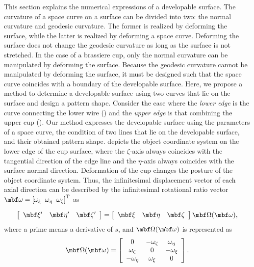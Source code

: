 \documentclass[E]{scitrans}
\begin{document}
This section explains the numerical expressions of a developable surface. The curvature of a space curve on a surface can be divided into two: the normal curvature and geodesic curvature. The former is realized by deforming the surface, while the latter is realized by deforming a space curve. Deforming the surface does not change the geodesic curvature as long as the surface is not stretched. In the case of a brassiere cup, only the normal curvature can be manipulated by deforming the surface. Because the geodesic curvature cannot be manipulated by deforming the surface, it must be designed such that the space curve coincides with a boundary of the developable surface. 
Here, we propose a method to determine a developable surface using two curves that lie on the surface and design a pattern shape. Consider the case where the \textit{lower edge} is the curve connecting the lower wire () and the \textit{upper edge} is that combining the upper cup (). Our method expresses the developable surface using the parameters of a space curve, the condition of two lines that lie on the developable surface, and their obtained pattern shape.  depicts the object coordinate system on the lower edge of the cup surface, where the $\zeta$-axis always coincides with the tangential direction of the edge line and the  $ \eta $-axis always coincides with the surface normal direction. Deformation of the cup changes the posture of the object coordinate system. Thus, the infinitesimal displacement vector of each axial direction can be described by the infinitesimal rotational ratio vector $ \mbold{\omega} = \left[\omega_{\xi}\;\;\omega_{\eta}\;\;\omega_{\zeta}\right]^{\mathrm{T}}$ as

\begin{equation}\label{eq:ObjSys}
\left[\begin{array}{ccc} \xivec' & \etavec' & \zetavec' \end{array}\right] = \left[\begin{array}{ccc} \xivec & \etavec & \zetavec \end{array} \right] \mbold{\Omega}(\mbold{\omega}), 
\end{equation}
where a prime means a derivative of $s$, and $\mbold{\Omega}(\mbold{\omega})$ is represented as
\begin{equation}
\mbold{\Omega}(\mbold{\omega}) = \left[\begin{array}{ccc}
0 &-\omega_{\zeta} & \omega_{\eta} \\
\omega_{\zeta} & 0 &-\omega_{\xi} \\
-\omega_{\eta} & \omega_{\xi} &0
\end{array}\right]. 
\end{equation}
\end{document}
